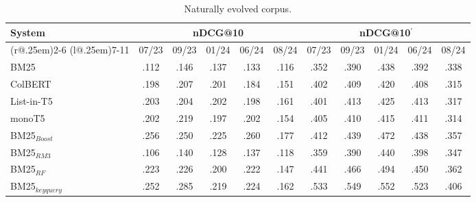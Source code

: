 \begin{table}[t]
\small
\centering
\renewcommand{\tabcolsep}{3.2pt}
\caption{Naturally evolved corpus.}
\label{tab:table-results}

\begin{tabular}{@{}l@{}cccccccccc@{}}
    \toprule
    \bfseries System & \multicolumn{5}{c}{\bfseries nDCG@10} & \multicolumn{5}{c}{\bfseries nDCG@10$^{'}$}\\
    \cmidrule(r@{.25em}){2-6}
    \cmidrule(l@{.25em}){7-11}
    
    & 07/23 & 09/23 & 01/24 & 06/24 & 08/24 & 07/23 & 09/23 & 01/24 & 06/24 & 08/24\\
    
    \midrule

    BM25 & .112 & .146 & .137 & .133 & .116 & .352 & .390 & .438 & .392 & .338 \\
    ColBERT & .198 & .207 & .201 & .184 & .151 & .402 & .409 & .420 & .408 & .315 \\
    List-in-T5 & .203 & .204 & .202 & .198 & .161 & .401 & .413 & .425 & .413 & .317 \\
    monoT5 & .202 & .219 & .197 & .202 & .154 & .405 & .410 & .415 & .411 & .314 \\
    
    \midrule
    
    BM25$_{Boost}$ & .256 & .250 & .225 & .260 & .177 & .412 & .439 & .472 & .438 & .357 \\
    BM25$_{RM3}$ & .106 & .140 & .128 & .137 & .118 & .359 & .390 & .440 & .398 & .347 \\
    BM25$_{RF}$ & .223 & .226 & .200 & .222 & .147 & .441 & .466 & .494 & .450 & .362 \\
    BM25$_{keyquery}$ & .252 & .285 & .219 & .224 & .162 & .533 & .549 & .552 & .523 & .406 \\

\bottomrule
\end{tabular}
\end{table}
